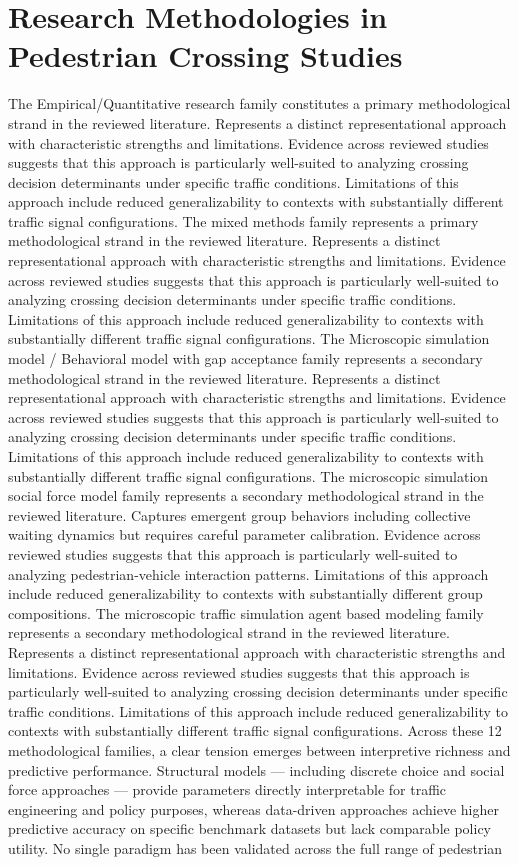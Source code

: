\documentclass{article}
\begin{document}
\section{Research Methodologies in Pedestrian Crossing Studies}
The Empirical/Quantitative research family constitutes a primary methodological strand in the reviewed literature. Represents a distinct representational approach with characteristic strengths and limitations. Evidence across reviewed studies suggests that this approach is particularly well-suited to analyzing crossing decision determinants under specific traffic conditions. Limitations of this approach include reduced generalizability to contexts with substantially different traffic signal configurations. The mixed methods family represents a primary methodological strand in the reviewed literature. Represents a distinct representational approach with characteristic strengths and limitations. Evidence across reviewed studies suggests that this approach is particularly well-suited to analyzing crossing decision determinants under specific traffic conditions. Limitations of this approach include reduced generalizability to contexts with substantially different traffic signal configurations. The Microscopic simulation model / Behavioral model with gap acceptance family represents a secondary methodological strand in the reviewed literature. Represents a distinct representational approach with characteristic strengths and limitations. Evidence across reviewed studies suggests that this approach is particularly well-suited to analyzing crossing decision determinants under specific traffic conditions. Limitations of this approach include reduced generalizability to contexts with substantially different traffic signal configurations. The microscopic simulation social force model family represents a secondary methodological strand in the reviewed literature. Captures emergent group behaviors including collective waiting dynamics but requires careful parameter calibration. Evidence across reviewed studies suggests that this approach is particularly well-suited to analyzing pedestrian-vehicle interaction patterns. Limitations of this approach include reduced generalizability to contexts with substantially different group compositions. The microscopic traffic simulation agent based modeling family represents a secondary methodological strand in the reviewed literature. Represents a distinct representational approach with characteristic strengths and limitations. Evidence across reviewed studies suggests that this approach is particularly well-suited to analyzing crossing decision determinants under specific traffic conditions. Limitations of this approach include reduced generalizability to contexts with substantially different traffic signal configurations. Across these 12 methodological families, a clear tension emerges between interpretive richness and predictive performance. Structural models — including discrete choice and social force approaches — provide parameters directly interpretable for traffic engineering and policy purposes, whereas data-driven approaches achieve higher predictive accuracy on specific benchmark datasets but lack comparable policy utility. No single paradigm has been validated across the full range of pedestrian 
\end{document}
